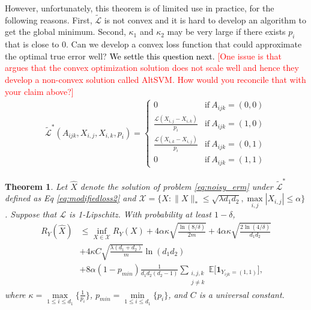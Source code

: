 \documentclass[conference]{IEEEtran}
\numberwithin{equation}{section}
\newcommand{\LL}[1]{\textcolor{red}{[#1]}}
\newcommand{\laks}[1]{\textcolor{black}{#1}}
\newcommand{\E}{\mathbb{E}}
\newtheorem{theorem}{Theorem}
\newtheorem{sampling strategy}{Sampling Strategy}
\begin{document}
However, unfortunately, this theorem is of  limited use in practice, for the following reasons. First, $\tilde{\mathcal{L}}$ is not convex and it is hard to develop an algorithm to get the global minimum. Second, $\kappa_1$ and $\kappa_2$ may be very large if there exists $p_i$ that is close to 0. Can we develop a convex loss function that could approximate the optimal true error well? \laks{We settle this question next.}  
\LL{One issue is that \cite{cr} argues that the convex optimization solution does not scale well and hence they develop a non-convex solution called AltSVM. How would you reconcile that with your claim above?}
\begin{equation}
    \begin{aligned}
        \tilde{\mathcal{L}}^*(A_{ijk}, X_{i,j}, X_{i,k}, p_i) = 
        \begin{cases}
            0 & \text{if}~ A_{ijk} = (0,0) \\
            \frac{ \mathcal{L}(X_{i,j} - X_{i,k})  }{p_i} &   \text{if}~ A_{ijk} = (1,0) \\
            \frac{ \mathcal{L}(X_{i,k} - X_{i,j})  }{p_i} &   \text{if}~ A_{ijk} = (0,1) \\
            0 &   \text{if} ~A_{ijk} = (1,1)
        \end{cases}
    \end{aligned}
    \label{eq:modifiedloss2}
\end{equation}

\begin{theorem}
Let $\hat{X}$ denote the solution of problem \ref{eq:noisy_erm} under $\tilde{\mathcal{L}}^*$ defined as Eq \ref{eq:modifiedloss2} and $\mathcal{X} = \{X: \|X\|_* \leq \sqrt{\lambda d_1 d_2}, \underset{i,j}{\max} |X_{i,j}| \leq \alpha \}$. Suppose that $\mathcal{L}$ is 1-Lipschitz.  With probability at least $1 - \delta$,
\begin{equation}
\begin{aligned}
 R_Y(\hat{X}) & \leq  \underset{X\in \mathcal{X}}{\inf} R_Y(X) + 4 \alpha \kappa \sqrt{\frac{\ln(8/\delta)}{2m}} + 4\alpha \kappa \sqrt{ \frac{2\ln(4/\delta) }{d_1 d_2} } \\
        & + 4 \kappa C \sqrt{\frac{\lambda (d_1 + d_2)}{m}} \ln(d_1 d_2) \\
        & +  8\alpha(1 - p_{min})  \frac{1}{d_1 d_2 (d_2 - 1)} \sum_{ \substack{i,j,k\\ j \neq k}} \E\Big[ \bm{1}_{Y_{ijk} = (1,1)} \Big],
\end{aligned}
\end{equation} 
where $\kappa = \underset{1 \leq i \leq d_1}{\max}\{\frac{1}{p_i}\}$, $p_{min} = \underset{1 \leq i \leq d_1}{\min}\{p_i\}$, and $C$ is a universal constant.
\label{thm:truerisk2}
\end{theorem}
\end{document}
